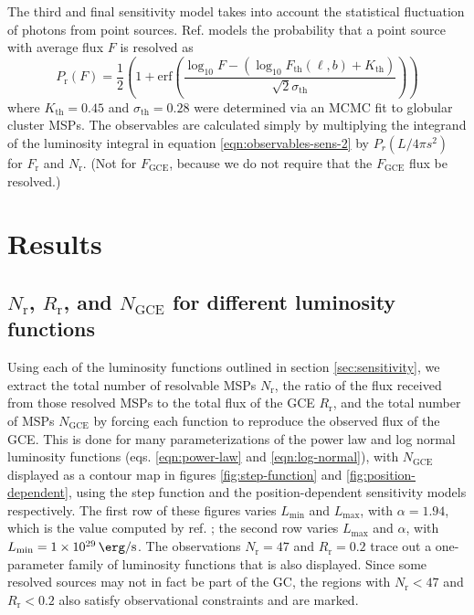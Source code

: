 \documentclass[a4paper,11pt]{article}
\newcommand{\parens}[1]{\left(#1\right)}
\newcommand{\comment}[1]{\emph{\color{red}{#1}}}
\begin{document}
The third and final sensitivity model takes into account the statistical fluctuation of photons from point sources. Ref. \cite{Ploeg:2020jeh} models the probability that a point source with average flux $F$ is resolved as
\begin{equation}
    P_\text{r}(F) = \frac{1}{2} \parens{1 + \text{erf} \parens{\frac{\log_{10} F - (\log_{10} F_\text{th}(\ell, b) + K_\text{th})}{\sqrt{2}\sigma_\text{th}}}}
    \label{eqn:ploeg-smoothing}
\end{equation}
where $K_\text{th} = 0.45$ and $\sigma_\text{th} = 0.28$ were determined via an MCMC fit to globular cluster MSPs. The observables are calculated simply by multiplying the integrand of the luminosity integral in equation \ref{eqn:observables-sens-2} by $P_r(L/4\pi s^2)$ for $F_\text{r}$ and $N_\text{r}$. (Not for $F_\text{GCE}$, because we do not require that the $F_\text{GCE}$ flux be resolved.) \comment{Should I mention how much the sensitivity models differ, or wait until the results have been presented?}






\section{Results}
\subsection{$N_\text{r}$, $R_\text{r}$, and $N_\text{GCE}$ for different luminosity functions}
Using each of the luminosity functions outlined in section \ref{sec:sensitivity}, we extract the total number of resolvable MSPs $N_\text{r}$, the ratio of the flux received from those resolved MSPs to the total flux of the GCE $R_\text{r}$, and the total number of MSPs $N_\text{GCE}$ by forcing each function to reproduce the observed flux of the GCE. This is done for many parameterizations of the power law and log normal luminosity functions (eqs. \ref{eqn:power-law} and \ref{eqn:log-normal}), with $N_\text{GCE}$ displayed as a contour map in figures \ref{fig:step-function} and \ref{fig:position-dependent}, using the step function and the position-dependent sensitivity models respectively. The first row of these figures varies $L_\text{min}$ and $L_\text{max}$, with $\alpha=1.94$, which is the value computed by ref. \cite{Zhong:2019ycb}; the second row varies $L_\text{max}$ and $\alpha$, with $L_\text{min}=\SI{1e29}{\erg\per\second}$. The observations $N_\text{r}=47$ and $R_\text{r}=0.2$ trace out a one-parameter family of luminosity functions that is also displayed. Since some resolved sources may not in fact be part of the GC, the regions with $N_\text{r} < 47$ and $R_\text{r} < 0.2$ also satisfy observational constraints and are marked.
\end{document}
